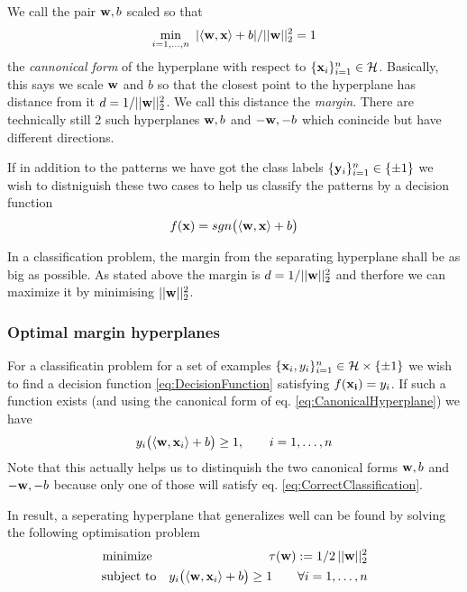 We call the pair $\mathbf{w},b$ scaled so that
\begin{equation}\label{eq:CanonicalHyperplane}
 \min_{i=1,\ldots,n} ~ |\langle \mathbf{w},\mathbf{x} \rangle + b | / || \mathbf{w}||_2^2 = 1
\end{equation}
the \emph{cannonical form} of the hyperplane with respect to $\{\mathbf{x}_i\}_{i=1}^n \in \mathcal{H}$.
Basically, this says we scale $\mathbf{w}$ and $b$ so that the closest point to the hyperplane has distance from it $d = 1 / || \mathbf{w}||_2^2$. We call this distance the \emph{margin}.
There are technically still 2 such hyperplanes $\mathbf{w},b$ and $-\mathbf{w},-b$ which conincide but have different directions.

If in addition to the patterns we have got the class labels $\{\mathbf{y}_i\}_{i=1}^n \in \{\pm 1\}$ we wish to distniguish these two cases to help us classify the patterns by a decision function
\begin{equation}\label{eq:DecisionFunction}
 f(\mathbf{x}) = sgn \big( \langle \mathbf{w},\mathbf{x} \rangle + b \big)
\end{equation}

In a classification problem, the margin from the separating hyperplane shall be as big as possible. As stated above the margin is $d = 1/|| \mathbf{w}||_2^2$ and therfore we can maximize it by minimising $|| \mathbf{w}||_2^2$.




\subsubsection{Optimal margin hyperplanes}
For a classificatin problem for a set of examples $\{\mathbf{x}_i,y_i\}_{i=1}^n \in \mathcal{H} \times \{ \pm 1\}$ we wish to find a decision function \eqref{eq:DecisionFunction} satisfying $f(\mathbf{x_i}) = y_i$.
If such a function exists (and using the canonical form of eq. \eqref{eq:CanonicalHyperplane}) we have 
\begin{equation}\label{eq:CorrectClassification}
y_i \big( \langle \mathbf{w},\mathbf{x}_i \rangle + b \big) \geq 1, \qquad i=1,\ldots,n 
\end{equation}
Note that this actually helps us to distinquish the two canonical forms $\mathbf{w},b$ and $-\mathbf{w},-b$ because only one of those will satisfy eq. \eqref{eq:CorrectClassification}.

In result, a seperating hyperplane that generalizes well can be found by solving the following optimisation problem
\begin{eqnarray}\label{eq:SVMPrimal}\index{SVM primal problem}
  \text{minimize }  & & \tau(\vc{w}):= 1/2 \, ||\vc{w}||_2^2 \nonumber \\
  \text{subject to} & & y_i \big( \langle \vc{w},\vc{x}_i \rangle + b \big) \geq 1 
\qquad \forall i=1,\ldots,n
\end{eqnarray}

